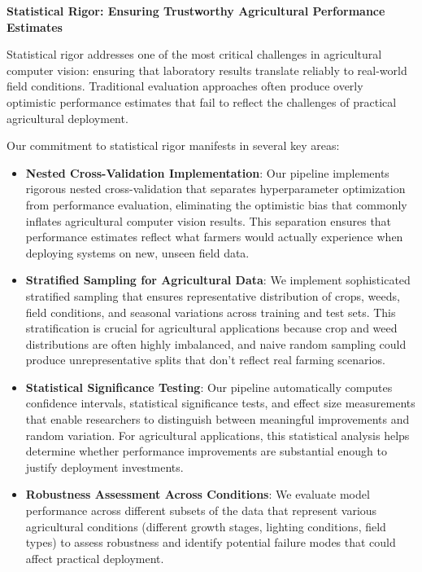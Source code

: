 \textbf{Statistical Rigor: Ensuring Trustworthy Agricultural Performance Estimates}

Statistical rigor addresses one of the most critical challenges in agricultural computer vision: ensuring that laboratory results translate reliably to real-world field conditions. Traditional evaluation approaches often produce overly optimistic performance estimates that fail to reflect the challenges of practical agricultural deployment.

Our commitment to statistical rigor manifests in several key areas:

\begin{itemize}
    \item \textbf{Nested Cross-Validation Implementation}: Our pipeline implements rigorous nested cross-validation that separates hyperparameter optimization from performance evaluation, eliminating the optimistic bias that commonly inflates agricultural computer vision results. This separation ensures that performance estimates reflect what farmers would actually experience when deploying systems on new, unseen field data.
    
    \item \textbf{Stratified Sampling for Agricultural Data}: We implement sophisticated stratified sampling that ensures representative distribution of crops, weeds, field conditions, and seasonal variations across training and test sets. This stratification is crucial for agricultural applications because crop and weed distributions are often highly imbalanced, and naive random sampling could produce unrepresentative splits that don't reflect real farming scenarios.
    
    \item \textbf{Statistical Significance Testing}: Our pipeline automatically computes confidence intervals, statistical significance tests, and effect size measurements that enable researchers to distinguish between meaningful improvements and random variation. For agricultural applications, this statistical analysis helps determine whether performance improvements are substantial enough to justify deployment investments.
    
    \item \textbf{Robustness Assessment Across Conditions}: We evaluate model performance across different subsets of the data that represent various agricultural conditions (different growth stages, lighting conditions, field types) to assess robustness and identify potential failure modes that could affect practical deployment.
\end{itemize}

